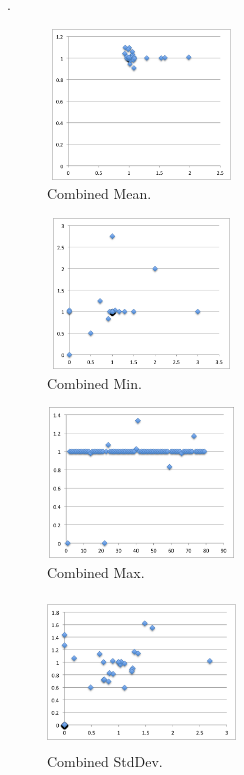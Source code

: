 \documentclass[conference]{IEEEtran}
\begin{document}
\newpage.














\newpage

\begin{figure}[ht]
\centering
\includegraphics[width=5cm,height=4cm]{combineMean.png}
\caption{Combined Mean.}
\label{fig:Mean}
\end{figure}


\begin{figure}[ht]
\centering
\includegraphics[width=5cm,height=4cm]{combineMin.png}
\caption{Combined Min.}
\label{fig:Min}
\end{figure}


\begin{figure}[ht]
\centering
\includegraphics[width=5cm,height=4cm]{combineMax.png}
\caption{Combined Max.}
\label{fig:Max}
\end{figure}


\begin{figure}[ht]
\centering
\includegraphics[width=5cm,height=4cm]{combineStdDev.png}
\caption{Combined StdDev.}
\label{fig:StdDev}
\end{figure}
\end{document}
